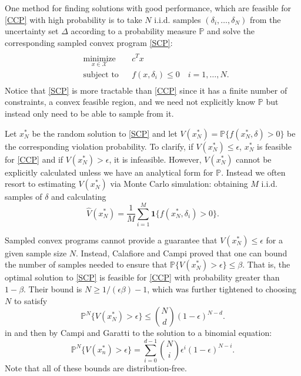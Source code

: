 \documentclass[12pt]{article}
\begin{document}
One method for finding solutions with good performance, which are feasible for \ref{CCP} with high probability is to take $N$ i.i.d. samples $(\delta_i, \ldots, \delta_N)$ from the uncertainty set $\Delta$ according to a probability measure $\mathbb{P}$ and solve the corresponding sampled convex program \ref{SCP}:
\begin{align}\label{SCP}
\begin{split}
\begin{aligned}
    & \underset{x \in \mathcal{X}}{\text{minimize}}
    & & c^T x \\
    & \text{subject to}
    & & f(x,\delta_i) \leq 0 \quad i = 1, \ldots, N.
\end{aligned}
\end{split} \tag{SCP$_N$}
\end{align}
Notice that \ref{SCP} is more tractable than \ref{CCP} since it has a finite number of constraints, a convex feasible region, and we need not explicitly know $\mathbb{P}$ but instead only need to be able to sample from it.

Let $x_N^*$ be the random solution to \ref{SCP} and let $V(x_N^*) = \mathbb{P}\{f(x_N^*, \delta) > 0\}$ be the corresponding violation probability.
To clarify, if $V(x_N^*) \leq \epsilon$, $x_N^*$ is feasible for \ref{CCP} and if $V(x_N^*) > \epsilon$, it is infeasible.
However, $V(x_N^*)$ cannot be explicitly calculated unless we have an analytical form for $\mathbb{P}$.
Instead we often resort to estimating $V(x_N^*)$ via Monte Carlo simulation: obtaining $M$ i.i.d. samples of $\delta$ and calculating
\[ \hat{V}(x_N^*) = \frac{1}{M} \sum_{i = 1}^M \mathbf{1}\{f(x_N^*, \delta_i) > 0\}. \]

Sampled convex programs cannot provide a guarantee that $V(x_N^*) \leq \epsilon$ for a given sample size $N$.
Instead, Calafiore and Campi \cite{campi05} proved that one can bound the number of samples needed to ensure that $\mathbb{P}\{V(x_N^*) > \epsilon\} \leq \beta$.
That is, the optimal solution to \ref{SCP} is feasible for \ref{CCP} with probability greater than $1 - \beta$.
Their bound is $N \geq 1/(\epsilon\beta) - 1$, which was further tightened to choosing $N$ to satisfy
\[ \mathbb{P}^N\{V(x_N^*) > \epsilon\} \leq \binom{N}{d}(1-\epsilon)^{N-d}. \]
in \cite{campi06} and then by Campi and Garatti \cite{campi08} to the solution to a binomial equation:
\[ \mathbb{P}^N\{V(x_n^*) > \epsilon\} = \sum_{i=0}^{d-1} \binom{N}{i} \epsilon^i (1-\epsilon)^{N-i}. \]
Note that all of these bounds are distribution-free.
\end{document}
